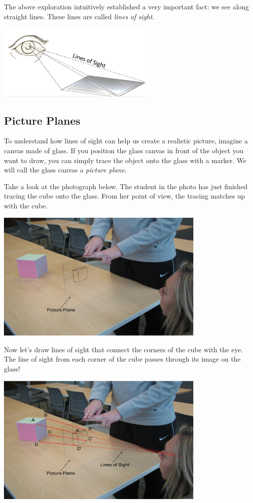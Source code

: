 \documentclass{ximera}
\begin{document}
The above exploration intuitively established a very important fact: we see along straight lines.  These lines are called \emph{lines of sight}.
\begin{image}
         \includegraphics[width=3in]{linesOfSight.jpg}
\end{image}

\subsection*{Picture Planes}
To understand how lines of sight can help us create a realistic picture, imagine a canvas made of glass.  If you position the glass canvas in front of the object you want to draw, you can simply trace the object onto the glass with a marker.  We will call the glass canvas a \emph{picture plane}.

Take a look at the photograph below.  The student in the photo has just finished tracing the cube onto the glass.  From her point of view, the tracing matches up with the cube. 

\begin{image}
         \includegraphics[width=4in]{cube.jpg}
\end{image}

Now let’s draw lines of sight that connect the corners of the cube with the eye. The line of sight from each corner of the cube passes through its image on the glass!  

\begin{image}
         \includegraphics[width=4in]{cubeLines.jpg}
\end{image}
\end{document}
